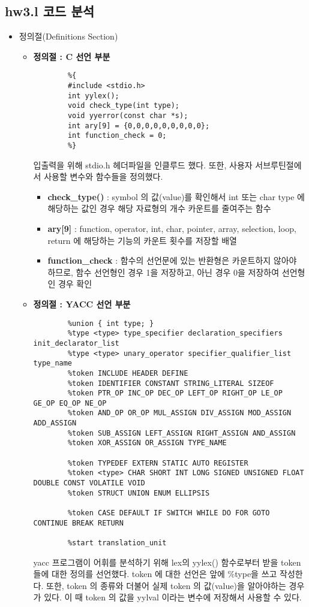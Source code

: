 \documentclass{article}
\begin{document}
\subsection{hw3.l 코드 분석}
\begin{itemize}
	\item 정의절(Definitions Section)	
	\begin{itemize}
		\item {\bf 정의절 : C 선언 부분}
		\begin{lstlisting}
		%{
		#include <stdio.h>
		int yylex();
		void check_type(int type);
		void yyerror(const char *s);
		int ary[9] = {0,0,0,0,0,0,0,0,0};
		int function_check = 0;
		%}
		\end{lstlisting}
		입출력을 위해 stdio.h 헤더파일을 인클루드 했다.
		또한, 사용자 서브루틴절에서 사용할 변수와 함수들을 정의했다.
		\begin{itemize}
			\item {\bf check\_type()} : symbol 의 값(value)를 확인해서
			int 또는 char type 에 해당하는 값인 경우 해당 자료형의 개수 카운트를 줄여주는 함수
			\item {\bf ary[9]} : function, operator, int, char, pointer, array, selection,
			loop, return 에 해당하는 기능의 카운트 횟수를 저장할 배열
			\item {\bf function\_check} : 함수의 선언문에 있는 반환형은 카운트하지 않아야 하므로,
			함수 선언형인 경우 1을 저장하고, 아닌 경우 0을 저장하여 선언형인 경우 확인
		\end{itemize}

		\item {\bf 정의절 : YACC 선언 부분}
		\begin{lstlisting}
		%union { int type; }
		%type <type> type_specifier declaration_specifiers init_declarator_list
		%type <type> unary_operator specifier_qualifier_list type_name
		%token INCLUDE HEADER DEFINE
		%token IDENTIFIER CONSTANT STRING_LITERAL SIZEOF
		%token PTR_OP INC_OP DEC_OP LEFT_OP RIGHT_OP LE_OP GE_OP EQ_OP NE_OP
		%token AND_OP OR_OP MUL_ASSIGN DIV_ASSIGN MOD_ASSIGN ADD_ASSIGN
		%token SUB_ASSIGN LEFT_ASSIGN RIGHT_ASSIGN AND_ASSIGN
		%token XOR_ASSIGN OR_ASSIGN TYPE_NAME
		
		%token TYPEDEF EXTERN STATIC AUTO REGISTER
		%token <type> CHAR SHORT INT LONG SIGNED UNSIGNED FLOAT DOUBLE CONST VOLATILE VOID
		%token STRUCT UNION ENUM ELLIPSIS
		
		%token CASE DEFAULT IF SWITCH WHILE DO FOR GOTO CONTINUE BREAK RETURN
		
		%start translation_unit
		\end{lstlisting}
		yacc 프로그램이 어휘를 분석하기 위해 lex의 yylex() 함수로부터 받을 token 들에 대한 정의를 선언했다.
		token 에 대한 선언은 앞에 \%type을 쓰고 작성한다. 또한, token 의 종류와 더불어 실제 token 의 값(value)을
		알아야하는 경우가 있다. 이 때 token 의 값을 yylval 이라는 변수에 저장해서 사용할 수 있다. 


\end{itemize}
\end{itemize}
\end{document}
